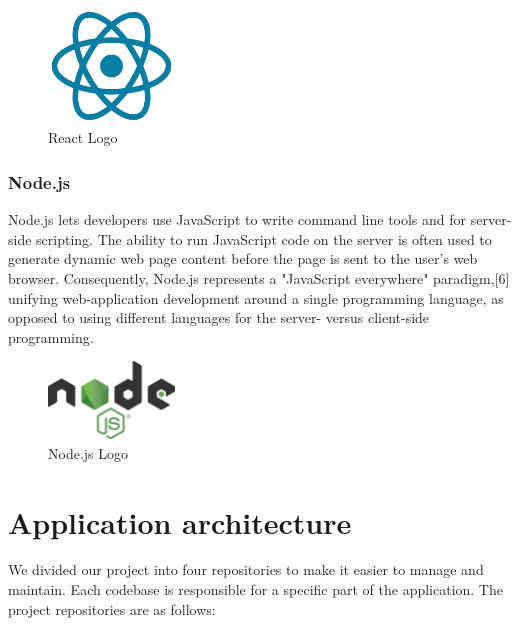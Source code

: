 \begin{figure}[h!]
      \centering
      \includegraphics[width=0.3\textwidth]{images/reactjs.png}
      \caption{React Logo}
      \label{fig:react}
\end{figure}



\newpage

\subsubsection{Node.js}
Node.js lets developers use JavaScript to write command line tools and for server-side scripting. The ability to run JavaScript code on the server is often used to generate dynamic web page content before the page is sent to the user's web browser. Consequently, Node.js represents a "JavaScript everywhere" paradigm,[6] unifying web-application development around a single programming language, as opposed to using different languages for the server- versus client-side programming.
\begin{figure}[h!]
      \centering
      \includegraphics[width=0.3\textwidth]{images/node.png}
      \caption{Node.js Logo}
      \label{fig:Node.js}
\end{figure}
\bigbreak
\section{Application architecture}
We divided our project into four repositories to make it easier to manage and
maintain. Each codebase is responsible for a specific part of the application.
The project repositories are as follows:

